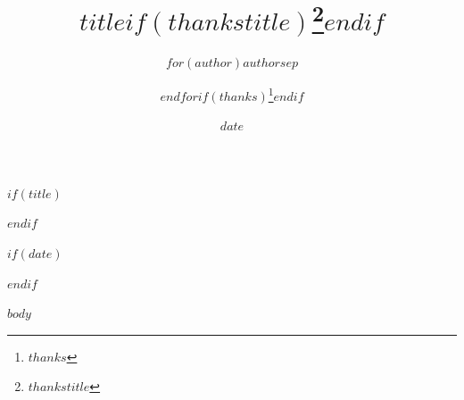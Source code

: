 \documentclass[12pt]{article}
\newcommand{\1}[1]{\mathbf{1}\{#1\}}
\theoremstyle{plain}
\theoremstyle{definition}
\theoremstyle{remark}
\begin{document}
$if(title)$
\title{$title$$if(thankstitle)$\thanks{$thankstitle$}$endif$}
$endif$
\author{$for(author)$$author$$sep$ \and $endfor$$if(thanks)$\thanks{$thanks$}$endif$}
$if(date)$\date{$date$}$endif$
\maketitle

\vspace{-.3in}

$body$
\end{document}
